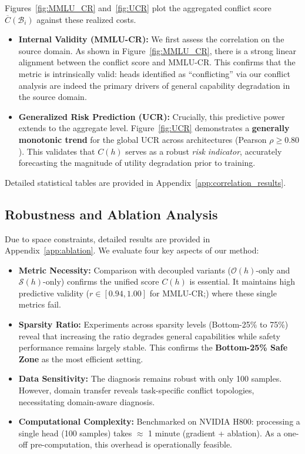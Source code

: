 \documentclass[11pt]{article}
\begin{document}
Figures~\ref{fig:MMLU_CR} and~\ref{fig:UCR} plot the aggregated conflict score $\overline{C}(\mathcal{B}_i)$ against these realized costs.

\begin{itemize}[leftmargin=*,itemsep=2pt, topsep=0pt, parsep=0pt]
    \item \textbf{Internal Validity (MMLU-CR):} We first assess the correlation on the source domain. As shown in Figure~\ref{fig:MMLU_CR}, there is a strong linear alignment between the conflict score and MMLU-CR. This confirms that the metric is intrinsically valid: heads identified as ``conflicting'' via our conflict analysis are indeed the primary drivers of general capability degradation in the source domain.
    
    \item \textbf{Generalized Risk Prediction (UCR):} Crucially, this predictive power extends to the aggregate level. Figure~\ref{fig:UCR} demonstrates a \textbf{generally monotonic trend} for the global UCR across architectures (Pearson $\rho \ge 0.80$). This validates that $C(h)$ serves as a robust \textit{risk indicator}, accurately forecasting the magnitude of utility degradation prior to training.
\end{itemize}
\noindent Detailed statistical tables are provided in Appendix~\ref{app:correlation_results}.

\subsection{Robustness and Ablation Analysis}
\label{sec:ablation_summary}

Due to space constraints, detailed results are provided in Appendix~\ref{app:ablation}. We evaluate four key aspects of our method:

\begin{itemize}[leftmargin=*,itemsep=3pt, topsep=2pt, parsep=0pt]
    \item \textbf{Metric Necessity:} Comparison with decoupled variants ($\mathcal{O}(h)$-only and $\mathcal{S}(h)$-only) confirms the unified score $C(h)$ is essential. It maintains high predictive validity ($r \in [0.94, 1.00]$ for MMLU-CR;) where these single metrics fail.

    \item \textbf{Sparsity Ratio:} Experiments across sparsity levels (Bottom-25\% to 75\%) reveal that increasing the ratio degrades general capabilities while safety performance remains largely stable. This confirms the \textbf{Bottom-25\% Safe Zone} as the most efficient setting.

    \item \textbf{Data Sensitivity:} The diagnosis remains robust with only 100 samples. However, domain transfer reveals task-specific conflict topologies, necessitating domain-aware diagnosis.

    \item \textbf{Computational Complexity:} Benchmarked on NVIDIA H800: processing a single head (100 samples) takes $\approx$ 1 minute (gradient + ablation). As a one-off pre-computation, this overhead is operationally feasible.
\end{itemize}
\end{document}
